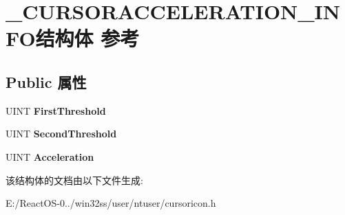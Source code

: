 \hypertarget{struct___c_u_r_s_o_r_a_c_c_e_l_e_r_a_t_i_o_n___i_n_f_o}{}\section{\+\_\+\+C\+U\+R\+S\+O\+R\+A\+C\+C\+E\+L\+E\+R\+A\+T\+I\+O\+N\+\_\+\+I\+N\+F\+O结构体 参考}
\label{struct___c_u_r_s_o_r_a_c_c_e_l_e_r_a_t_i_o_n___i_n_f_o}
\subsection*{Public 属性}
\begin{DoxyCompactItemize}
\item 
\mbox{\label{struct___c_u_r_s_o_r_a_c_c_e_l_e_r_a_t_i_o_n___i_n_f_o_a4e3f469807d280269201a7c6c7c67c86}} 
U\+I\+NT {\bfseries First\+Threshold}
\item 
\mbox{\label{struct___c_u_r_s_o_r_a_c_c_e_l_e_r_a_t_i_o_n___i_n_f_o_a71ace4f92955c46b1006dcb964fa1f93}} 
U\+I\+NT {\bfseries Second\+Threshold}
\item 
\mbox{\label{struct___c_u_r_s_o_r_a_c_c_e_l_e_r_a_t_i_o_n___i_n_f_o_affb4035436eea6d51934968e57e9d559}} 
U\+I\+NT {\bfseries Acceleration}
\end{DoxyCompactItemize}


该结构体的文档由以下文件生成\+:\begin{DoxyCompactItemize}
\item 
E\+:/\+React\+O\+S-\/0../win32ss/user/ntuser/cursoricon.\+h\end{DoxyCompactItemize}
